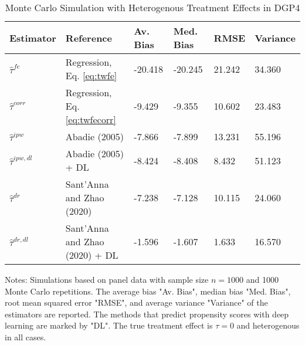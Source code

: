 \begin{table}[]
\centering
\begin{threeparttable}
\caption{Monte Carlo Simulation with Heterogenous Treatment Effects in DGP4}
\label{tab:table2}
\begin{tabular}{llllll}
\toprule
\hline
\addlinespace
Estimator         & Reference                         & Av. Bias   & Med. Bias   & RMSE & Variance  \\ \midrule
\addlinespace
$\hat{\tau}^{fe}$ & Regression, Eq. \eqref{eq:twfe}               & -20.418      & -20.245        & 21.242 & 34.360      \\
$\hat{\tau}^{corr}$ & Regression, Eq. \eqref{eq:twfecorr}           & -9.429      & -9.355       & 10.602 & 23.483      \\
$\hat{\tau}^{ipw}$ & Abadie (2005)                    & -7.866       & -7.899       & 13.231 & 55.196      \\
$\hat{\tau}^{ipw,dl}$ & Abadie (2005) + DL            & -8.424       & -8.408        & 8.432 & 51.123      \\
$\hat{\tau}^{dr}$ & Sant'Anna and Zhao (2020)         & -7.238      & -7.128        & 10.115 & 24.060      \\
$\hat{\tau}^{dr,dl}$ & Sant'Anna and Zhao (2020) + DL & -1.596       & -1.607        & 1.633 & 16.570      \\

\bottomrule
\end{tabular}
\begin{tablenotes}
    \item Notes: Simulations based on panel data with sample size $n = 1000$ and 1000 Monte Carlo repetitions. The average bias "Av. Bias", median bias "Med. Bias", root mean squared error "RMSE", and average variance "Variance" of the estimators are reported. The methods that predict propensity scores with deep learning are marked by "DL". The true treatment effect is $\tau = 0$ and heterogenous in all cases.
\end{tablenotes}
\end{threeparttable}
\end{table}
